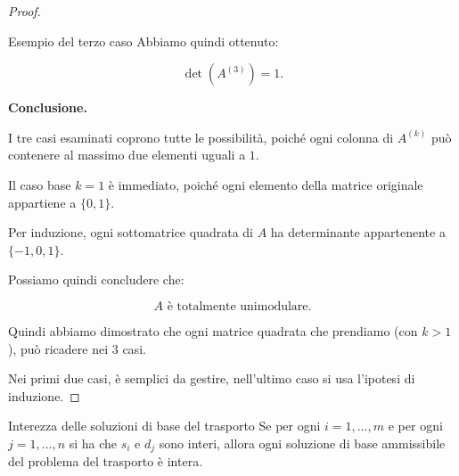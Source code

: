 \begin{proof}
\begin{example}{Esempio del terzo caso}
    Abbiamo quindi ottenuto:

    \[
    \boxed{\det(A^{(3)})=1.}
    \]

\textbf{Conclusione.}

I tre casi esaminati coprono tutte le possibilità,
poiché ogni colonna di $A^{(k)}$ può contenere
al massimo due elementi uguali a $1$.

Il caso base $k=1$ è immediato, poiché ogni
elemento della matrice originale appartiene
a $\{0,1\}$.

Per induzione, ogni sottomatrice quadrata
di $A$ ha determinante appartenente a
$\{-1,0,1\}$.

Possiamo quindi concludere che:

\[
\boxed{A \text{ è totalmente unimodulare}.}
\]

\end{example}

Quindi abbiamo dimostrato che ogni matrice quadrata che prendiamo (con $k > 1$), può ricadere nei 3 casi.

Nei primi due casi, è semplici da gestire, nell'ultimo caso si usa l'ipotesi di induzione.
\end{proof}

\begin{corollary}{Interezza delle soluzioni di base del trasporto}
\label{cor:trasporto-intero}
Se per ogni $i = 1,\dots,m$ e per ogni $j = 1,\dots,n$ si ha che $s_i$ e $d_j$ sono interi, allora ogni soluzione di base ammissibile del problema del trasporto è intera. 
\end{corollary}

